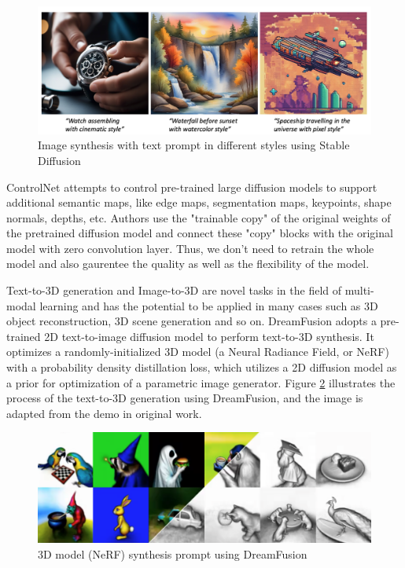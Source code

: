 \documentclass[12pt,DIV14,BCOR12mm,a4paper,footinclude=false,headinclude,parskip=half-,twoside,openright,cleardoublepage=empty,toc=index,bibliography=totoc,listof=totoc]{scrreprt}
\numberwithin{equation}{chapter}
\begin{document}
\begin{figure}[h]
	\centering
	\includegraphics[scale=0.217]{img/sd.png}
	\caption{Image synthesis with text prompt in different styles using Stable Diffusion}
	\label{img:sd}
\end{figure}

ControlNet\cite{zhang2023adding} attempts to control pre-trained large diffusion models to support additional semantic maps, like edge maps, segmentation maps, keypoints, shape normals, depths, etc. Authors use the "trainable copy" of the original weights of the pretrained diffusion model and connect these "copy" blocks with the original model with zero convolution layer. Thus, we don't need to retrain the whole model and also gaurentee the quality as well as the flexibility of the model.

Text-to-3D generation and Image-to-3D are novel tasks in the field of multi-modal learning and has the potential to be applied in many cases such as 3D object reconstruction, 3D scene generation and so on. DreamFusion\cite{poole2022dreamfusion} adopts a pre-trained 2D text-to-image diffusion model to perform text-to-3D synthesis. It optimizes a randomly-initialized 3D model (a Neural Radiance Field, or NeRF) with a probability density distillation loss, which utilizes a 2D diffusion model as a prior for optimization of a parametric image generator. Figure \ref{img:df} illustrates the process of the text-to-3D generation using DreamFusion, and the image is adapted from the demo in original work.

\begin{figure}[h]
	\centering
	\includegraphics[scale=0.28]{img/df.png}
	\caption{3D model (NeRF) synthesis prompt using DreamFusion}
	\label{img:df}
\end{figure}
\end{document}
